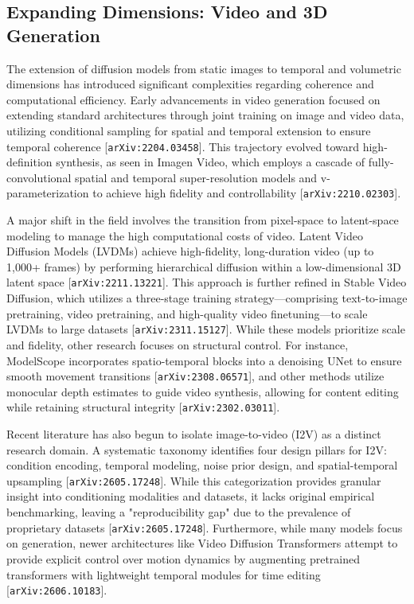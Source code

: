 \documentclass[11pt]{article}
\begin{document}
\subsection{Expanding Dimensions: Video and 3D Generation}

The extension of diffusion models from static images to temporal and volumetric dimensions has introduced significant complexities regarding coherence and computational efficiency. Early advancements in video generation focused on extending standard architectures through joint training on image and video data, utilizing conditional sampling for spatial and temporal extension to ensure temporal coherence [\texttt{arXiv:2204.03458}]. This trajectory evolved toward high-definition synthesis, as seen in Imagen Video, which employs a cascade of fully-convolutional spatial and temporal super-resolution models and v-parameterization to achieve high fidelity and controllability [\texttt{arXiv:2210.02303}].

A major shift in the field involves the transition from pixel-space to latent-space modeling to manage the high computational costs of video. Latent Video Diffusion Models (LVDMs) achieve high-fidelity, long-duration video (up to 1,000+ frames) by performing hierarchical diffusion within a low-dimensional 3D latent space [\texttt{arXiv:2211.13221}]. This approach is further refined in Stable Video Diffusion, which utilizes a three-stage training strategy—comprising text-to-image pretraining, video pretraining, and high-quality video finetuning—to scale LVDMs to large datasets [\texttt{arXiv:2311.15127}]. While these models prioritize scale and fidelity, other research focuses on structural control. For instance, ModelScope incorporates spatio-temporal blocks into a denoising UNet to ensure smooth movement transitions [\texttt{arXiv:2308.06571}], and other methods utilize monocular depth estimates to guide video synthesis, allowing for content editing while retaining structural integrity [\texttt{arXiv:2302.03011}].

Recent literature has also begun to isolate image-to-video (I2V) as a distinct research domain. A systematic taxonomy identifies four design pillars for I2V: condition encoding, temporal modeling, noise prior design, and spatial-temporal upsampling [\texttt{arXiv:2605.17248}]. While this categorization provides granular insight into conditioning modalities and datasets, it lacks original empirical benchmarking, leaving a "reproducibility gap" due to the prevalence of proprietary datasets [\texttt{arXiv:2605.17248}]. Furthermore, while many models focus on generation, newer architectures like Video Diffusion Transformers attempt to provide explicit control over motion dynamics by augmenting pretrained transformers with lightweight temporal modules for time editing [\texttt{arXiv:2606.10183}].
\end{document}

